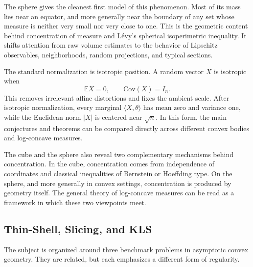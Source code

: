 \documentclass[10pt]{article}
\begin{document}
The sphere gives the cleanest first model of this phenomenon. Most of its mass lies near an equator, and more generally near the boundary of any set whose measure is neither very small nor very close to one. This is the geometric content behind concentration of measure and L\'evy's spherical isoperimetric inequality. It shifts attention from raw volume estimates to the behavior of Lipschitz observables, neighborhoods, random projections, and typical sections.

The standard normalization is isotropic position. A random vector $X$ is isotropic when
\[
\mathbb{E}X=0, \qquad \mathrm{Cov}(X)=I_n.
\]
This removes irrelevant affine distortions and fixes the ambient scale. After isotropic normalization, every marginal $\langle X,\theta\rangle$ has mean zero and variance one, while the Euclidean norm $|X|$ is centered near $\sqrt{n}$. In this form, the main conjectures and theorems can be compared directly across different convex bodies and log-concave measures.

The cube and the sphere also reveal two complementary mechanisms behind concentration. In the cube, concentration comes from independence of coordinates and classical inequalities of Bernstein or Hoeffding type. On the sphere, and more generally in convex settings, concentration is produced by geometry itself. The general theory of log-concave measures can be read as a framework in which these two viewpoints meet.

\subsection{Thin-Shell, Slicing, and KLS}

The subject is organized around three benchmark problems in asymptotic convex geometry. They are related, but each emphasizes a different form of regularity.
\end{document}

